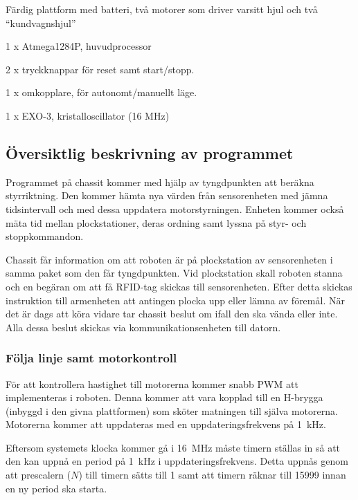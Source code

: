 \begin{packed_itemize}
\item Färdig plattform med batteri, två motorer som driver varsitt hjul och två “kundvagnshjul”
\item 1 x Atmega1284P, huvudprocessor
\item 2 x tryckknappar för reset samt start/stopp.
\item 1 x omkopplare, för autonomt/manuellt läge.
\item 1 x EXO-3, kristalloscillator (16 MHz)
\end{packed_itemize}

\subsection{Översiktlig beskrivning av programmet}

Programmet på chassit kommer med hjälp av tyngdpunkten att beräkna styrriktning. Den kommer hämta nya värden från sensorenheten med jämna tidsintervall och med dessa uppdatera motorstyrningen. Enheten kommer också mäta tid mellan plockstationer, deras ordning samt lyssna på styr- och stoppkommandon.

Chassit får information om att roboten är på plockstation av sensorenheten i samma paket som den får tyngdpunkten. Vid plockstation skall roboten stanna och en begäran om att få RFID-tag skickas till sensorenheten. Efter detta skickas instruktion till armenheten att antingen plocka upp eller lämna av föremål. När det är dags att köra vidare tar chassit beslut om ifall den ska vända eller inte. Alla dessa beslut skickas via kommunikationsenheten till datorn.



\subsubsection{Följa linje samt motorkontroll}

För att kontrollera hastighet till motorerna kommer snabb PWM att implementeras i roboten. Denna kommer att vara kopplad till en H-brygga (inbyggd i den givna plattformen)  som sköter matningen till själva motorerna. Motorerna kommer att uppdateras med en uppdateringsfrekvens på 1~kHz.

Eftersom systemets klocka kommer gå i 16~MHz måste timern ställas in så att den kan uppnå en period på 1~kHz i uppdateringsfrekvens. Detta uppnås genom att prescalern ($N$) till timern sätts till 1 samt att timern räknar till 15999 innan en ny period ska starta. 

